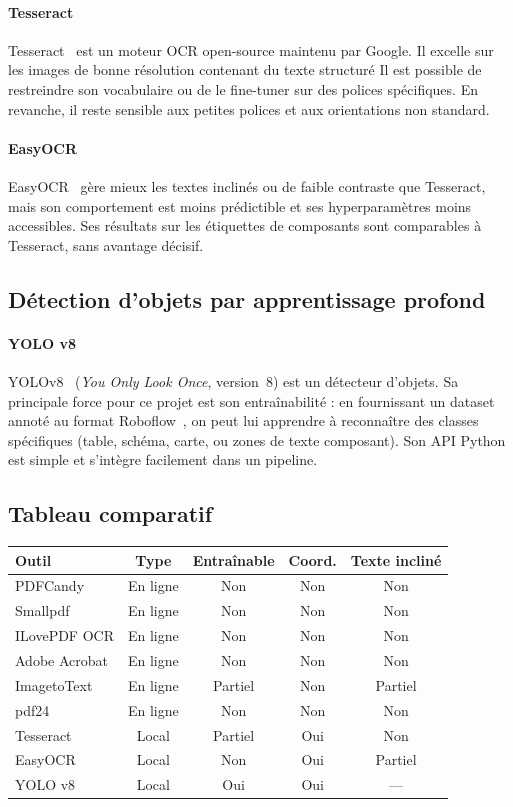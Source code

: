 \documentclass[a4paper,11pt]{article} %
\begin{document}
\paragraph{Tesseract}
Tesseract~\cite{tesseract} est un moteur OCR open-source maintenu par Google.
Il excelle sur les images de bonne résolution contenant du texte structuré
Il est possible de restreindre son vocabulaire ou de le fine-tuner sur des polices
spécifiques.
En revanche, il reste sensible aux petites polices et aux orientations non standard.

\paragraph{EasyOCR}
EasyOCR~\cite{easyocr} gère mieux les textes inclinés ou de faible contraste que Tesseract,
mais son comportement est moins prédictible et ses hyperparamètres moins accessibles.
Ses résultats sur les étiquettes de composants sont comparables à Tesseract,
sans avantage décisif.

\subsection{Détection d'objets par apprentissage profond}

\paragraph{YOLO v8}
YOLOv8~\cite{yolov8} (\textit{You Only Look Once}, version~8) est un détecteur d'objets.
Sa principale force pour ce projet est son entraînabilité : en fournissant un dataset
annoté au format Roboflow~\cite{roboflow}, on peut lui apprendre à reconnaître des classes
spécifiques (table, schéma, carte, ou zones de texte composant).
Son API Python est simple et s'intègre facilement dans un pipeline.

\subsection{Tableau comparatif}

\begin{center}
\begin{tabular}{lcccc}
\toprule
Outil & Type & Entraînable & Coord. & Texte incliné \\
\midrule
PDFCandy       & En ligne  & Non     & Non & Non \\
Smallpdf       & En ligne  & Non     & Non & Non \\
ILovePDF OCR   & En ligne  & Non     & Non & Non \\
Adobe Acrobat  & En ligne  & Non     & Non & Non \\
ImagetoText    & En ligne  & Partiel & Non & Partiel \\
pdf24          & En ligne  & Non     & Non & Non \\
Tesseract      & Local     & Partiel & Oui & Non \\
EasyOCR        & Local     & Non     & Oui & Partiel \\
YOLO v8        & Local     & Oui     & Oui & --- \\
\bottomrule
\end{tabular}
\end{center}
\end{document}

